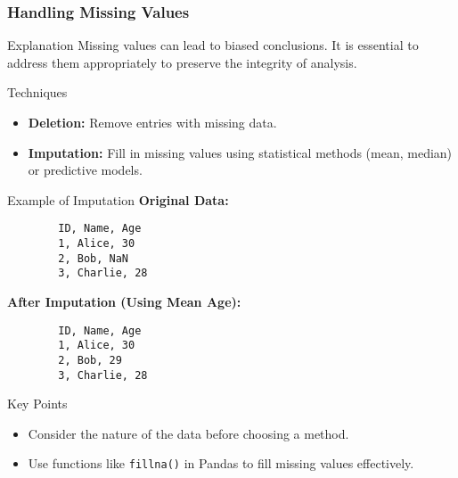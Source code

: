 \documentclass{beamer}
\begin{document}
\begin{frame}[fragile]
    \frametitle{Handling Missing Values}
    \begin{block}{Explanation}
        Missing values can lead to biased conclusions. It is essential to address them appropriately to preserve the integrity of analysis.
    \end{block}
    
    \begin{block}{Techniques}
        \begin{itemize}
            \item \textbf{Deletion:} Remove entries with missing data.
            \item \textbf{Imputation:} Fill in missing values using statistical methods (mean, median) or predictive models.
        \end{itemize}
    \end{block}
    
    \begin{block}{Example of Imputation}
        \textbf{Original Data:}
        \begin{verbatim}
        ID, Name, Age
        1, Alice, 30
        2, Bob, NaN
        3, Charlie, 28
        \end{verbatim}

        \textbf{After Imputation (Using Mean Age):}
        \begin{verbatim}
        ID, Name, Age
        1, Alice, 30
        2, Bob, 29
        3, Charlie, 28
        \end{verbatim}
    \end{block}
    
    \begin{block}{Key Points}
        \begin{itemize}
            \item Consider the nature of the data before choosing a method.
            \item Use functions like \texttt{fillna()} in Pandas to fill missing values effectively.
        \end{itemize}
    \end{block}
\end{frame}
\end{document}
